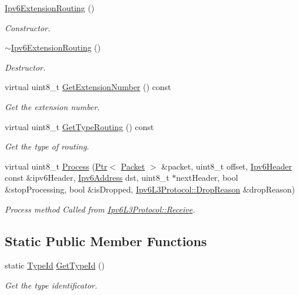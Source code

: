 \begin{DoxyCompactItemize}
\item 
\hyperlink{classns3_1_1Ipv6ExtensionRouting_a4bf4120da6d63f359f947e0594f2ecf0}{Ipv6\+Extension\+Routing} ()
\begin{DoxyCompactList}\small\item\em Constructor. \end{DoxyCompactList}\item 
\hyperlink{classns3_1_1Ipv6ExtensionRouting_a92a1868cb128bb346348bc9b6c3f8008}{$\sim$\+Ipv6\+Extension\+Routing} ()
\begin{DoxyCompactList}\small\item\em Destructor. \end{DoxyCompactList}\item 
virtual uint8\+\_\+t \hyperlink{classns3_1_1Ipv6ExtensionRouting_a18ab8cbbf50ee1a7ba5409d163b741f3}{Get\+Extension\+Number} () const 
\begin{DoxyCompactList}\small\item\em Get the extension number. \end{DoxyCompactList}\item 
virtual uint8\+\_\+t \hyperlink{classns3_1_1Ipv6ExtensionRouting_a8461c5d66b1fd869737b54e0598ec8aa}{Get\+Type\+Routing} () const 
\begin{DoxyCompactList}\small\item\em Get the type of routing. \end{DoxyCompactList}\item 
virtual uint8\+\_\+t \hyperlink{classns3_1_1Ipv6ExtensionRouting_afa441177f8a75d9683e826e5417b1a98}{Process} (\hyperlink{classns3_1_1Ptr}{Ptr}$<$ \hyperlink{classns3_1_1Packet}{Packet} $>$ \&packet, uint8\+\_\+t offset, \hyperlink{classns3_1_1Ipv6Header}{Ipv6\+Header} const \&ipv6\+Header, \hyperlink{classns3_1_1Ipv6Address}{Ipv6\+Address} dst, uint8\+\_\+t $\ast$next\+Header, bool \&stop\+Processing, bool \&is\+Dropped, \hyperlink{classns3_1_1Ipv6L3Protocol_a33c64db9bc35f71ff368b132bfffa37a}{Ipv6\+L3\+Protocol\+::\+Drop\+Reason} \&drop\+Reason)
\begin{DoxyCompactList}\small\item\em Process method Called from \hyperlink{classns3_1_1Ipv6L3Protocol_a8a95d576e8aee9a571db93bf686d850a}{Ipv6\+L3\+Protocol\+::\+Receive}. \end{DoxyCompactList}\end{DoxyCompactItemize}
\subsection*{Static Public Member Functions}
\begin{DoxyCompactItemize}
\item 
static \hyperlink{classns3_1_1TypeId}{Type\+Id} \hyperlink{classns3_1_1Ipv6ExtensionRouting_aab65ca143815f3e67e0a637eac26d886}{Get\+Type\+Id} ()
\begin{DoxyCompactList}\small\item\em Get the type identificator. \end{DoxyCompactList}\end{DoxyCompactItemize}

